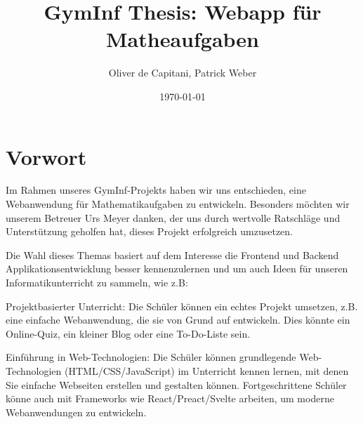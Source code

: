 \documentclass[12pt,a4paper]{article} %
\title{GymInf Thesis: Webapp für Matheaufgaben}
\date{\today}
\author{Oliver de Capitani, Patrick Weber}
\begin{document}
\maketitle %
% 











\newpage %
\tableofcontents %











\newpage


\section{Vorwort}
Im Rahmen unseres GymInf-Projekts haben wir uns entschieden, eine Webanwendung für Mathematikaufgaben zu entwickeln. Besonders möchten wir unserem Betreuer Urs Meyer danken, der uns durch wertvolle Ratschläge und Unterstützung geholfen hat, dieses Projekt erfolgreich umzusetzen.

Die Wahl dieses Themas basiert auf dem Interesse die Frontend und Backend Applikationsentwicklung besser kennenzulernen und um auch Ideen für unseren Informatikunterricht zu sammeln, wie z.B:

Projektbasierter Unterricht: Die Schüler können ein echtes Projekt umsetzen, z.B. eine einfache Webanwendung, die sie von Grund auf entwickeln. Dies könnte ein Online-Quiz, ein kleiner Blog oder eine To-Do-Liste sein.

Einführung in Web-Technologien: Die Schüler können grundlegende Web-Technologien (HTML/CSS/JavaScript) im Unterricht kennen lernen, mit denen Sie einfache Webseiten erstellen und gestalten können. Fortgeschrittene Schüler könne auch mit Frameworks wie React/Preact/Svelte arbeiten, um moderne Webanwendungen zu entwickeln.
\end{document}
